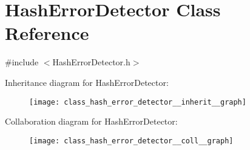 \hypertarget{class_hash_error_detector}{}\section{Hash\+Error\+Detector Class Reference}
\label{class_hash_error_detector}


{\ttfamily \#include $<$Hash\+Error\+Detector.\+h$>$}



Inheritance diagram for Hash\+Error\+Detector\+:\nopagebreak
\begin{figure}[H]
\begin{center}
\leavevmode
\texttt{[image: class\_hash\_error\_detector\_\_inherit\_\_graph]}
\end{center}
\end{figure}


Collaboration diagram for Hash\+Error\+Detector\+:\nopagebreak
\begin{figure}[H]
\begin{center}
\leavevmode
\texttt{[image: class\_hash\_error\_detector\_\_coll\_\_graph]}
\end{center}
\end{figure}
